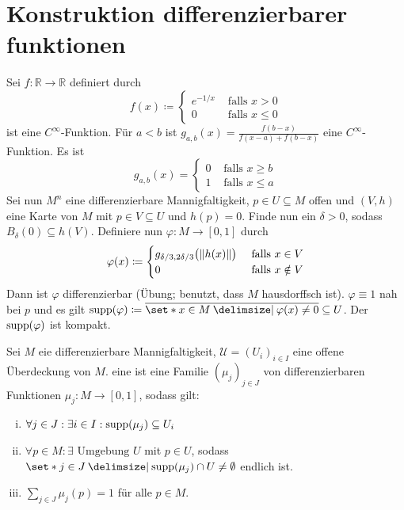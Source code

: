 \section*{Konstruktion differenzierbarer funktionen} %
\label{sec:konstruktion_differenzierbarer_funktionen}
\setcounter{definition}{14}
\begin{bemerkung}
	Sei $f \colon \mathbb{R}\to \mathbb{R}$ definiert durch 
	\[
		f(x) \coloneqq \begin{cases}
			e^{-1/x} &\text{ falls }x>0\\
			0 &\text{ falls } x \le 0
		\end{cases}
	\]
	ist eine $C^\infty$-Funktion.
	Für $a < b$ ist $g_{a,b}(x) = \frac{f(b-x)}{f(x-a) + f(b-x)}$ eine $C^\infty$-Funktion.
	Es ist 
	\[
		g_{a,b}(x)= \begin{cases}
			0 &\text{ falls }x \ge b\\
			1 &\text{ falls } x \le a
		\end{cases}
	\]
	Sei nun $M^n$ eine differenzierbare Mannigfaltigkeit, $p \in U \subseteq M$ offen und $(V,h)$ eine Karte von $M$ mit $p \in V \subseteq U$ und $h(p)=0$.
	Finde nun ein $\delta >0$, sodass $B_\delta(0) \subseteq h(V)$.
	Definiere nun $\varphi \colon M \to [0,1]$ durch
	\[
		\varphi(x) \coloneqq \begin{cases}
			g_{\delta/3,2\delta/3} \enbrace[\big]{\norm*{h(x)}} &\text{ falls }x \in V\\
			0 &\text{ falls } x \notin V
		\end{cases}
	\]
	Dann ist $\varphi$ differenzierbar (Übung; benutzt, dass $M$ hausdorffsch ist).
	$\varphi \equiv 1$ nah bei $p$ und es gilt $\supp(\varphi) \coloneqq \overline{\set*{x \in M \given \varphi(x)\neq 0}} \subseteq U$.
	Der  $\supp(\varphi)$ ist kompakt.
\end{bemerkung}

\begin{definition}
	Sei $M$ eie differenzierbare Mannigfaltigkeit, $\mathcal{U} = (U_i)_{i \in I}$ eine offene Überdeckung von $M$.
	eine  ist eine Familie $(\mu_j)_{j \in J}$ von differenzierbaren Funktionen $\mu_j \colon M \to [0,1]$, sodass gilt:
	\begin{enumerate}[(i)]
		\item $\forall j \in J : \exists i \in I : \supp(\mu_j) \subseteq U_i$
		\item $\forall p \in M : \exists \text{ Umgebung } U$ mit $p \in U$, sodass $\set*{j \in J \given \supp(\mu_j) \cap U \neq \emptyset}$ endlich ist.
		\item $\sum_{j \in J} \mu_j(p) = 1$ für alle $p \in M$.
	\end{enumerate}
\end{definition}

